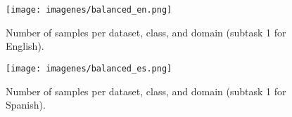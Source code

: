 \documentclass[a4paper,11pt,twocolumn,twoside]{article}
\begin{document}
\begin{figure}[!h]
 \centering
 \texttt{[image: imagenes/balanced\_en.png]}  
 \caption{\centering Number of samples per dataset, class, and domain (subtask 1 for English).}
 \label{fig:balanced_en}
\end{figure}

\begin{figure}[!h]
 \centering
 \texttt{[image: imagenes/balanced\_es.png]}
 \caption{\centering Number of samples per dataset, class, and domain (subtask 1 for Spanish).}
 \label{fig:balanced_es}
\end{figure}




\end{document}
